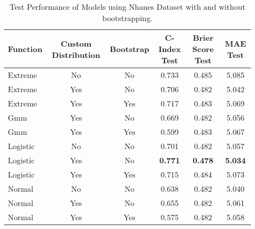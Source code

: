 \begin{table}[h!]
\centering
\caption{Test Performance of Models using Nhanes Dataset with and without bootstrapping.}
\label{tab:test_performance_nhanes_2}
\begin{tabular}{l|c|c|c|c|c}
\hline
\textbf{Function} & \textbf{Custom Distribution} & \textbf{Bootstrap} & \textbf{C-Index Test} & \textbf{Brier Score Test} & \textbf{MAE Test} \\
\hline
Extreme & No & No & 0.733 & 0.485 & 5.085 \\
Extreme & Yes & No & 0.706 & 0.482 & 5.042 \\
Extreme & Yes & Yes & 0.717 & 0.483 & 5.069 \\
Gmm & Yes & No & 0.669 & 0.482 & 5.056 \\
Gmm & Yes & Yes & 0.599 & 0.483 & 5.067 \\
Logistic & No & No & 0.701 & 0.482 & 5.057 \\
Logistic & Yes & No & \textbf{0.771} & \textbf{0.478} & \textbf{5.034} \\
Logistic & Yes & Yes & 0.715 & 0.484 & 5.073 \\
Normal & No & No & 0.638 & 0.482 & 5.040 \\
Normal & Yes & No & 0.655 & 0.482 & 5.061 \\
Normal & Yes & Yes & 0.575 & 0.482 & 5.058 \\
\hline
\end{tabular}
\end{table}
